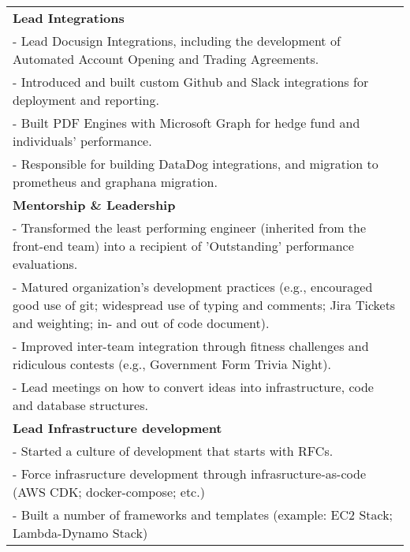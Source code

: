 \documentclass{article}
\begin{document}
\begin{table}[h]
    \begin{tabular*}{\textwidth}{@{\extracolsep{\fill}}p{}}
        \raggedright \small   \textbf{Lead Integrations}\\
        \small - Lead Docusign Integrations, including the development of Automated Account Opening and Trading Agreements.\\
        \small - Introduced and built custom Github and Slack integrations for deployment and reporting.\\
        \small - Built PDF Engines with Microsoft Graph for hedge fund and individuals' performance.\\
        \small - Responsible for building DataDog integrations, and migration to prometheus and graphana migration.\\
        \vspace{0.5em}
        \textbf{Mentorship \& Leadership}\\
        \small - Transformed the least performing engineer (inherited from the front-end team) into a recipient of 'Outstanding' performance evaluations.\\
        \small - Matured organization's development practices (e.g., encouraged good use of git; widespread use of typing and comments; Jira Tickets and weighting; in- and out of code document).\\
        \small - Improved inter-team integration through fitness challenges and ridiculous contests (e.g., Government Form Trivia Night). \\
        \small - Lead meetings on how to convert ideas into infrastructure, code and database structures. \\
        \vspace{0.5em}
        \textbf{Lead Infrastructure development}\\
        \small - Started a culture of development that starts with RFCs. \\
        \small - Force infrasructure development through infrasructure-as-code (AWS CDK; docker-compose; etc.) \\
        \small - Built a number of frameworks and templates (example: EC2 Stack; Lambda-Dynamo Stack)



\end{tabular*}
\end{table}
\end{document}

